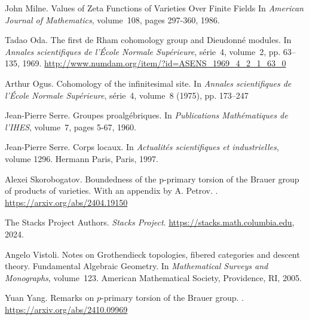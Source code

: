 \documentclass[11pt]{article}
\theoremstyle{plain}
\theoremstyle{definition}
\theoremstyle{remark}
\numberwithin{equation}{section}
\begin{document}
\begin{thebibliography}{9999}


John Milne.
\newblock Values of Zeta Functions of Varieties Over Finite Fields
\newblock In {\em American Journal of Mathematics}, volume~108, pages 297-360, 1986.

Tadao Oda.
\newblock The first de Rham cohomology group and Dieudonn\'{e} modules.
\newblock In {\em Annales scientifiques de l'École Normale Supérieure}, série~4, volume~2, pp. 63--135, 1969.
\url{http://www.numdam.org/item/?id=ASENS_1969_4_2_1_63_0}

Arthur Ogus.
\newblock Cohomology of the infinitesimal site.
\newblock In {\em Annales scientifiques de l'École Normale Supérieure}, série~4, volume~8 (1975), pp. 173--247

Jean-Pierre Serre.
\newblock Groupes proalg\'{e}briques.
\newblock In {\em Publications Mathématiques de l'IHES}, volume~7, pages 5-67, 1960.

Jean-Pierre Serre.
\newblock Corps locaux.
\newblock In {\em Actualités scientifiques et industrielles}, volume 1296. Hermann Paris, Paris, 1997.

Alexei Skorobogatov.
\newblock Boundedness of the p-primary torsion of the Brauer group of products of varieties. With an appendix by A. Petrov.
.
\newblock \url{https://arxiv.org/abs/2404.19150}


The {Stacks Project Authors}.
\newblock \textit{Stacks Project}.
\newblock \url{https://stacks.math.columbia.edu}, 2024.

Angelo Vistoli.
\newblock Notes on Grothendieck topologies, fibered categories and descent theory.
\newblock Fundamental Algebraic Geometry.
\newblock In {\em Mathematical Surveys and Monographs}, volume~123. American Mathematical Society, 
Providence, RI, 2005.

Yuan Yang.
\newblock Remarks on $p$-primary torsion of the Brauer group.
.
\url{https://arxiv.org/abs/2410.09969}

\end{thebibliography}
\end{document}
